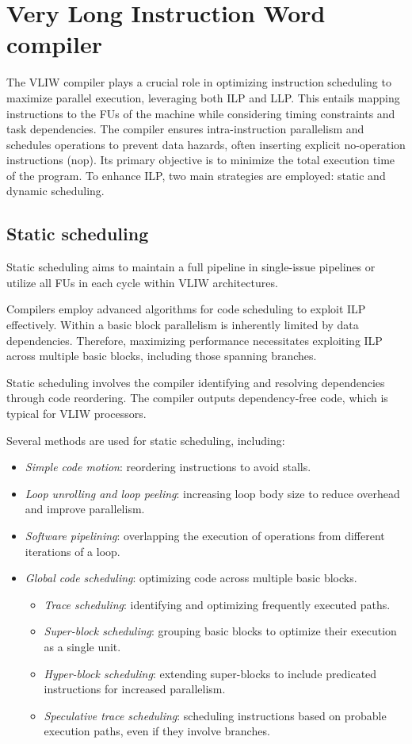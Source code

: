 \section{Very Long Instruction Word compiler}

The VLIW compiler plays a crucial role in optimizing instruction scheduling to maximize parallel execution, leveraging both ILP and LLP.
This entails mapping instructions to the FUs of the machine while considering timing constraints and task dependencies. 
The compiler ensures intra-instruction parallelism and schedules operations to prevent data hazards, often inserting explicit no-operation instructions (nop). 
Its primary objective is to minimize the total execution time of the program.
To enhance ILP, two main strategies are employed: static and dynamic scheduling. 

\subsection{Static scheduling}
Static scheduling aims to maintain a full pipeline in single-issue pipelines or utilize all FUs in each cycle within VLIW architectures. 

Compilers employ advanced algorithms for code scheduling to exploit ILP effectively. 
Within a basic block parallelism is inherently limited by data dependencies. 
Therefore, maximizing performance necessitates exploiting ILP across multiple basic blocks, including those spanning branches.

Static scheduling involves the compiler identifying and resolving dependencies through code reordering. 
The compiler outputs dependency-free code, which is typical for VLIW processors. 

Several methods are used for static scheduling, including:
\begin{itemize}
    \item \textit{Simple code motion}: reordering instructions to avoid stalls.
    \item \textit{Loop unrolling and loop peeling}: increasing loop body size to reduce overhead and improve parallelism.
    \item \textit{Software pipelining}: overlapping the execution of operations from different iterations of a loop.
    \item \textit{Global code scheduling}: optimizing code across multiple basic blocks.
        \begin{itemize}
            \item \textit{Trace scheduling}: identifying and optimizing frequently executed paths.
            \item \textit{Super-block scheduling}: grouping basic blocks to optimize their execution as a single unit.
            \item \textit{Hyper-block scheduling}: extending super-blocks to include predicated instructions for increased parallelism.
            \item \textit{Speculative trace scheduling}: scheduling instructions based on probable execution paths, even if they involve branches.
        \end{itemize}
\end{itemize}

